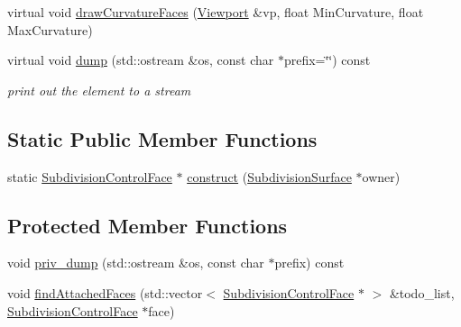 \begin{DoxyCompactItemize}
\item 
virtual void \hyperlink{classShipCADGeometry_1_1SubdivisionControlFace_aaf9226150996743d8d2ea560083ad1d8}{draw\-Curvature\-Faces} (\hyperlink{classShipCADGeometry_1_1Viewport}{Viewport} \&vp, float Min\-Curvature, float Max\-Curvature)
\item 
virtual void \hyperlink{classShipCADGeometry_1_1SubdivisionControlFace_a947868fba3e9bb6c587847fb9245c9ff}{dump} (std\-::ostream \&os, const char $\ast$prefix=\char`\"{}\char`\"{}) const 
\begin{DoxyCompactList}\small\item\em print out the element to a stream \end{DoxyCompactList}\end{DoxyCompactItemize}
\subsection*{Static Public Member Functions}
\begin{DoxyCompactItemize}
\item 
static \hyperlink{classShipCADGeometry_1_1SubdivisionControlFace}{Subdivision\-Control\-Face} $\ast$ \hyperlink{classShipCADGeometry_1_1SubdivisionControlFace_a4117f55ab3ec27bebd933f2992bc5dcd}{construct} (\hyperlink{classShipCADGeometry_1_1SubdivisionSurface}{Subdivision\-Surface} $\ast$owner)
\end{DoxyCompactItemize}
\subsection*{Protected Member Functions}
\begin{DoxyCompactItemize}
\item 
void \hyperlink{classShipCADGeometry_1_1SubdivisionControlFace_a224ce57a8d9d631eef63cccd8e0113f9}{priv\-\_\-dump} (std\-::ostream \&os, const char $\ast$prefix) const 
\item 
void \hyperlink{classShipCADGeometry_1_1SubdivisionControlFace_aa6035e53cd1e32a9bd9e9f9800c9f7d4}{find\-Attached\-Faces} (std\-::vector$<$ \hyperlink{classShipCADGeometry_1_1SubdivisionControlFace}{Subdivision\-Control\-Face} $\ast$ $>$ \&todo\-\_\-list, \hyperlink{classShipCADGeometry_1_1SubdivisionControlFace}{Subdivision\-Control\-Face} $\ast$face)
\end{DoxyCompactItemize}
